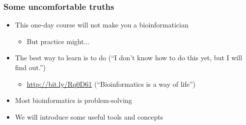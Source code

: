\begin{frame}
  \frametitle{Some uncomfortable truths}
  \begin{itemize}
    \item This one-day course will not make you a bioinformatician
    \begin{itemize}
      \item But practice might$\ldots$
    \end{itemize}
    \item The best way to learn is to do (``I don't know how to do this yet, but I will find out.'')
    \begin{itemize}
      \item \url{http://bit.ly/Rq0D61} (``Bioinformatics is a way of life'')
    \end{itemize}
    \item Most bioinformatics is problem-solving
    \item We will introduce some useful tools and concepts
  \end{itemize}
\end{frame}

